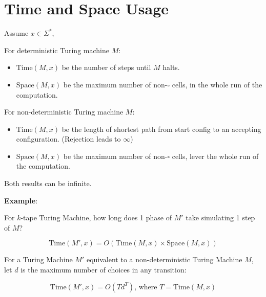 \section{Time and Space Usage}

Assume \(x \in \Sigma^*\),

\begin{definition}
For deterministic Turing machine $M$:
\begin{itemize}
\item
  \(\text{Time}(M,x)\) be the number of steps until \(M\) halts.
\item
  \(\text{Space}(M,x)\) be the maximum number of non-\(\square\) cells,
  in the whole run of the computation.
\end{itemize}
\end{definition}

\begin{definition}
For non-deterministic Turing machine $M$:
\begin{itemize}
\item
  \(\text{Time}(M,x)\) be the length of shortest path from start config
  to an accepting configuration. (Rejection leads to \(\infty\))
\item
  \(\text{Space}(M,x)\) be the maximum number of non-\(\square\) cells,
  lever the whole run of the computation.
\end{itemize}
\end{definition}

\begin{remark}
Both results can be infinite.
\end{remark}


\textbf{Example}:

For \(k\)-tape Turing Machine, how long does 1 phase of \(M'\) take
simulating 1 step of \(M\)?

$$\text{Time}(M',x) = O(\text{Time}(M,x)\times \text{Space}(M,x))$$

For a Turing Machine \(M'\) equivalent to a non-deterministic Turing
Machine \(M\), let \(d\) is the maximum number of choices in any
transition:

$$\text{Time}(M',x)=O(Td^T)\text{, where }T = \text{Time} (M,x)$$